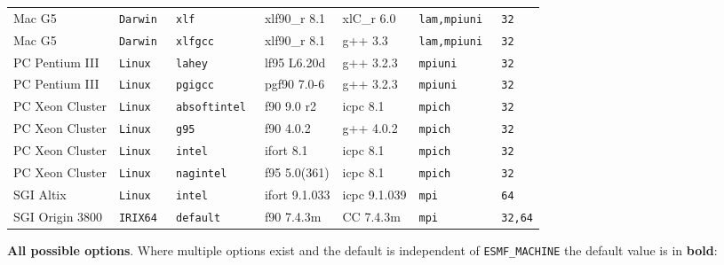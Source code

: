 \begin{tabular}{lllllll}
Mac G5          &\tt Darwin &\tt xlf     & xlf90\_r \footnotesize 8.1& xlC\_r \footnotesize 6.0 &\tt lam,mpiuni &\tt 32 \\
Mac G5          &\tt Darwin &\tt xlfgcc  & xlf90\_r \footnotesize 8.1& g++ \footnotesize 3.3    &\tt lam,mpiuni &\tt 32 \\
PC Pentium III  &\tt Linux  &\tt lahey   & lf95 \footnotesize L6.20d & g++ \footnotesize 3.2.3  &\tt mpiuni     &\tt 32 \\
PC Pentium III  &\tt Linux  &\tt pgigcc  & pgf90 \footnotesize 7.0-6 & g++ \footnotesize 3.2.3  &\tt mpiuni     &\tt 32 \\
PC Xeon Cluster &\tt Linux  &\tt absoftintel & f90 \footnotesize 9.0 r2 & icpc \footnotesize 8.1&\tt mpich      &\tt 32 \\
PC Xeon Cluster &\tt Linux  &\tt g95     & f90 \footnotesize 4.0.2   & g++ \footnotesize 4.0.2  &\tt mpich      &\tt 32 \\
PC Xeon Cluster &\tt Linux  &\tt intel   & ifort \footnotesize 8.1   & icpc \footnotesize 8.1   &\tt mpich      &\tt 32 \\
PC Xeon Cluster &\tt Linux  &\tt nagintel & f95 \footnotesize 5.0(361) & icpc \footnotesize 8.1 &\tt mpich      &\tt 32 \\
SGI Altix       &\tt Linux  &\tt intel   & ifort \footnotesize 9.1.033 & icpc \footnotesize 9.1.039 &\tt mpi    &\tt 64 \\
SGI Origin 3800 &\tt IRIX64 &\tt default & f90 \footnotesize 7.4.3m  & CC \footnotesize 7.4.3m  &\tt mpi        &\tt 32,64
\end{tabular}

\vspace{1ex}

{\bf All possible options}. Where multiple options exist 
and the default is independent of {\tt ESMF\_MACHINE} the default value is in {\bf bold}:

\vspace{1ex}


